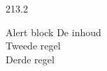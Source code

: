 \documentclass[final]{beamer}
\begin{document}
\begin{frame}{}
\begin{textblock}{213.2}
\begin{alertblock}{Alert block}
De inhoud\\
Tweede regel\\
Derde regel
\end{alertblock}
\end{textblock}  
  
\end{frame}
\end{document}
